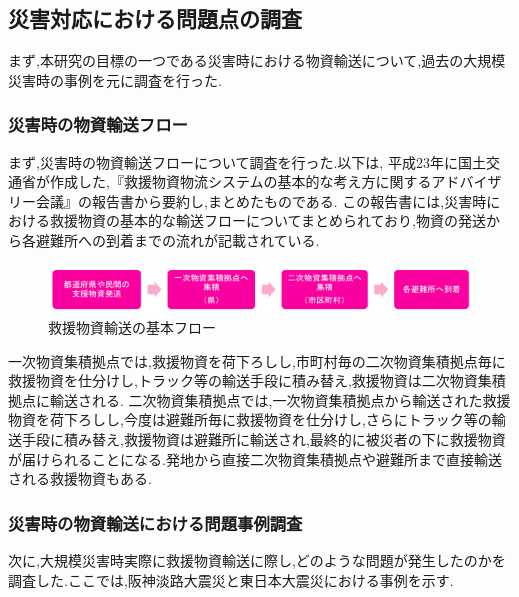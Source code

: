 \documentclass{article}[jsarticle]
\begin{document}
\subsection{災害対応における問題点の調査}
まず,本研究の目標の一つである災害時における物資輸送について,過去の大規模災害時の事例を元に調査を行った.
\subsubsection{災害時の物資輸送フロー}
まず,災害時の物資輸送フローについて調査を行った.以下は, 平成23年に国土交通省が作成した,『救援物資物流システムの基本的な考え方に関するアドバイザリー会議』の報告書から要約し,まとめたものである.
この報告書には,災害時における救援物資の基本的な輸送フローについてまとめられており,物資の発送から各避難所への到着までの流れが記載されている.
\begin{figure}[H]
    \centering
    \includegraphics[width=\textwidth]{./Images/20240127180600.png}
    \caption{救援物資輸送の基本フロー}
\end{figure}
一次物資集積拠点では,救援物資を荷下ろしし,市町村毎の二次物資集積拠点毎に救援物資を仕分けし,トラック等の輸送手段に積み替え,救援物資は二次物資集積拠点に輸送される.
二次物資集積拠点では,一次物資集積拠点から輸送された救援物資を荷下ろしし,今度は避難所毎に救援物資を仕分けし,さらにトラック等の輸送手段に積み替え,救援物資は避難所に輸送され,最終的に被災者の下に救援物資が届けられることになる.発地から直接二次物資集積拠点や避難所まで直接輸送される救援物資もある.\par 

\subsubsection{災害時の物資輸送における問題事例調査}
次に,大規模災害時実際に救援物資輸送に際し,どのような問題が発生したのかを調査した.ここでは,阪神淡路大震災と東日本大震災における事例を示す.
\end{document}
